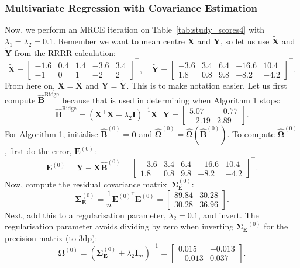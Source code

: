 \documentclass[11pt]{report} %
\begin{document}
\subsubsection{Multivariate Regression with Covariance Estimation}
Now, we perform an MRCE iteration on Table~\ref{tab:study_scores4} with \(\lambda_1 = \lambda_2 = 0.1\). Remember we want to mean centre $\mathbf{X}$ and $\mathbf{Y}$, so let us use \(\mathbf{\tilde{X}}\) and \(\mathbf{\tilde{Y}}\) from the RRRR calculation: 
\[
\tilde{\mathbf{X}} =
\begin{bmatrix}
-1.6  & 0.4  & 1.4  & -3.6  & 3.4 \\
-1  & 0  & 1  & -2  & 2
\end{bmatrix}^{\top},
\quad
\tilde{\mathbf{Y}} =
\begin{bmatrix}
-3.6  & 3.4  & 6.4  & -16.6  & 10.4 \\
1.8  & 0.8  & 9.8  & -8.2  & -4.2
\end{bmatrix}^{\top}.
\]
From here on, $\mathbf{X} = \tilde{\mathbf{X}}$ and $\mathbf{Y} = \tilde{\mathbf{Y}}$. This is to make notation easier. Let us first compute $\mathbf{\hat{B}}^{\text{Ridge}}$ because that is used in determining when Algorithm 1 stops:
\[
\mathbf{\hat{B}}^{\text{Ridge}}=(\mathbf{X}^\top \mathbf{X} + \lambda_2 \mathbf{I})^{-1} \mathbf{X}^\top \mathbf{Y}=\begin{bmatrix}
5.07  & -0.77  \\
-2.19  & 2.89 
\end{bmatrix}.
\]
For Algorithm 1, initialise \(\hat{\mathbf{B}}^{(0)} = \mathbf{0} \) and \( \hat{\mathbf{\Omega}}^{(0)} = \hat{\mathbf{\Omega}}(\hat{\mathbf{B}}^{(0)}) \).
To compute $\hat{\mathbf{\Omega}}^{(0)}$, first do the error, $\mathbf{E}^{(0)}$:
\[
\mathbf{\mathbf{E}}^{(0)} = \mathbf{Y} - \mathbf{X} \mathbf{\hat{B}}^{(0)} =
\begin{bmatrix}
-3.6  & 3.4  & 6.4  & -16.6  & 10.4 \\
1.8  & 0.8  & 9.8  & -8.2  & -4.2
\end{bmatrix}^{\top}.
\]
Now, compute the residual covariance matrix \(\ \mathbf{\Sigma}^{(0)}_\mathbf{E}\):
\[
\mathbf{\Sigma}^{(0)}_\mathbf{E}= \frac{1}{n} \mathbf{\mathbf{E}}^{{(0)^{\top}}} \mathbf{\mathbf{E}}^{(0)} =
\begin{bmatrix}
89.84 & 30.28 \\
30.28 & 36.96
\end{bmatrix}.
\]
Next, add this to a regularisation parameter, $\lambda_2=0.1$, and invert. The regularisation parameter avoids dividing by zero when inverting $\mathbf{\Sigma_E}^{(0)}$ for the precision matrix (to 3dp):
\begin{equation}
\mathbf{\Omega}^{(0)} = (\mathbf{\Sigma}^{(0)}_\mathbf{E} + \lambda_2 \mathbf{I}_m)^{-1} = \begin{bmatrix}
0.015 & -0.013 \\
-0.013 & 0.037
\end{bmatrix}.
\end{equation}
\end{document}
